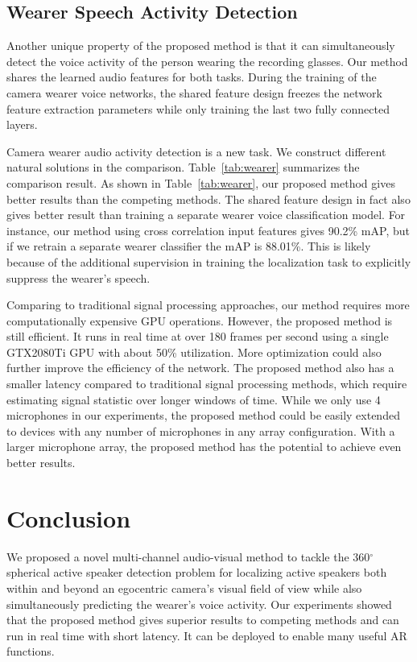 \documentclass[10pt,twocolumn,letterpaper]{article}
\begin{document}
\vspace{-5pt}
\subsection{Wearer Speech Activity Detection}
\vspace{-5pt}
Another unique property of the proposed method is that it can simultaneously detect the voice activity of the person wearing the recording glasses. 
Our method shares the learned audio 
features for both tasks. During the training of the camera wearer voice networks, 
the shared feature design freezes the network feature extraction parameters while only training the last two fully connected layers.

Camera wearer audio activity detection is a new task. We construct different natural solutions in the comparison.
Table~\ref{tab:wearer} summarizes the comparison result.
As shown in Table~\ref{tab:wearer}, our proposed method gives better results than the competing methods.
The shared feature design in fact also gives better result than training a separate wearer voice classification model.
For instance, our method using cross correlation input features gives 90.2\% mAP, but if we retrain a separate wearer classifier 
the mAP is 88.01\%.
This is likely because of the additional supervision in training the localization task to explicitly suppress the wearer's speech. 


Comparing to traditional signal processing approaches, our method requires more computationally expensive GPU operations.
However, the proposed method is still efficient. It runs in real time at over 180 frames per second using a single GTX2080Ti GPU with about 50\% utilization. More optimization could also further improve
the efficiency of the network. The proposed method also has a smaller latency compared to traditional signal processing methods, 
which require estimating signal statistic over longer windows of time.
While we only use 4 microphones in our experiments, the proposed method could be easily extended to devices with any number of microphones 
in any array configuration. With a larger microphone array, the proposed method has the potential to achieve even better results. 



\vspace{-5pt}
\section{Conclusion}
\vspace{-5pt}
We proposed a novel multi-channel audio-visual method to tackle the 360$^{\circ}$ spherical active speaker detection problem
for localizing active speakers both within and beyond an egocentric camera's visual field of view while also simultaneously predicting
the wearer's voice activity. 
Our experiments showed that the proposed method gives superior results to competing methods
and can run in real time with short latency. It can be deployed to enable many useful AR functions. 
\end{document}
